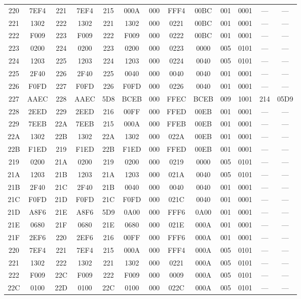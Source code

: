 \begin{center}
\begin{tabular}{|c|c|c|c|c|c|c|c|c|c|c|c|c|}
220 & 7EF4 & 221 & 7EF4 & 215 & 000A & 000 & FFF4 & 00BC & 001 & 0001 & --- & ---	\\
221 & 1302 & 222 & 1302 & 221 & 1302 & 000 & 0221 & 00BC & 001 & 0001 & --- & ---	\\
222 & F009 & 223 & F009 & 222 & F009 & 000 & 0222 & 00BC & 001 & 0001 & --- & ---	\\
223 & 0200 & 224 & 0200 & 223 & 0200 & 000 & 0223 & 0000 & 005 & 0101 & --- & ---	\\
224 & 1203 & 225 & 1203 & 224 & 1203 & 000 & 0224 & 0040 & 005 & 0101 & --- & ---	\\
225 & 2F40 & 226 & 2F40 & 225 & 0040 & 000 & 0040 & 0040 & 001 & 0001 & --- & ---	\\
226 & F0FD & 227 & F0FD & 226 & F0FD & 000 & 0226 & 0040 & 001 & 0001 & --- & ---	\\
227 & AAEC & 228 & AAEC & 5D8 & BCEB & 000 & FFEC & BCEB & 009 & 1001 & 214 & 05D9	\\
228 & 2EED & 229 & 2EED & 216 & 00FF & 000 & FFED & 00EB & 001 & 0001 & --- & ---	\\
229 & 7EEB & 22A & 7EEB & 215 & 000A & 000 & FFEB & 00EB & 001 & 0001 & --- & ---	\\
22A & 1302 & 22B & 1302 & 22A & 1302 & 000 & 022A & 00EB & 001 & 0001 & --- & ---	\\
22B & F1ED & 219 & F1ED & 22B & F1ED & 000 & FFED & 00EB & 001 & 0001 & --- & ---	\\
219 & 0200 & 21A & 0200 & 219 & 0200 & 000 & 0219 & 0000 & 005 & 0101 & --- & ---	\\
21A & 1203 & 21B & 1203 & 21A & 1203 & 000 & 021A & 0040 & 005 & 0101 & --- & ---	\\
21B & 2F40 & 21C & 2F40 & 21B & 0040 & 000 & 0040 & 0040 & 001 & 0001 & --- & ---	\\
21C & F0FD & 21D & F0FD & 21C & F0FD & 000 & 021C & 0040 & 001 & 0001 & --- & ---	\\
21D & A8F6 & 21E & A8F6 & 5D9 & 0A00 & 000 & FFF6 & 0A00 & 001 & 0001 & --- & ---	\\
21E & 0680 & 21F & 0680 & 21E & 0680 & 000 & 021E & 000A & 001 & 0001 & --- & ---	\\
21F & 2EF6 & 220 & 2EF6 & 216 & 00FF & 000 & FFF6 & 000A & 001 & 0001 & --- & ---	\\
220 & 7EF4 & 221 & 7EF4 & 215 & 000A & 000 & FFF4 & 000A & 005 & 0101 & --- & ---	\\
221 & 1302 & 222 & 1302 & 221 & 1302 & 000 & 0221 & 000A & 005 & 0101 & --- & ---	\\
222 & F009 & 22C & F009 & 222 & F009 & 000 & 0009 & 000A & 005 & 0101 & --- & ---	\\ 
22C & 0100 & 22D & 0100 & 22C & 0100 & 000 & 022C & 000A & 005 & 0101 & --- & ---	\\ 
\hline
\end{tabular}
\end{center}

